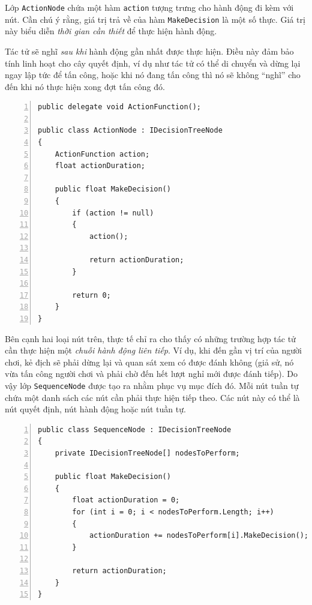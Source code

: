 \documentclass[12pt]{report}
\begin{document}
Lớp \texttt{ActionNode} chứa một hàm \texttt{action} tượng trưng cho hành động đi kèm với nút. Cần chú ý rằng, giá trị trả về của hàm \texttt{MakeDecision} là một số thực. Giá trị này biểu diễn \textit{thời gian cần thiết} để thực hiện hành động.

Tác tử sẽ nghĩ \textit{sau khi} hành động gần nhất được thực hiện. Điều này đảm bảo tính linh hoạt cho cây quyết định, ví dụ như tác tử có thể di chuyển và dừng lại ngay lập tức để tấn công, hoặc khi nó đang tấn công thì nó sẽ không ``nghĩ'' cho đến khi nó thực hiện xong đợt tấn công đó.

\begin{lstlisting}[frame=lines, basicstyle=\footnotesize\ttfamily, numbers=left, numberstyle=\tiny\color{black},caption= {Lớp \texttt{ActionNode}}, backgroundcolor=\color{background}]
public delegate void ActionFunction();

public class ActionNode : IDecisionTreeNode
{
	ActionFunction action;
	float actionDuration;

	public float MakeDecision()
	{
		if (action != null)
		{
			action();

			return actionDuration;
		}

		return 0;
	}
}
\end{lstlisting}

Bên cạnh hai loại nút trên, thực tế chỉ ra cho thấy có những trường hợp tác tử cần thực hiện một \textit{chuỗi hành động liên tiếp}. Ví dụ, khi đến gần vị trí của người chơi, kẻ địch sẽ phải dừng lại và quan sát xem có được đánh không (giả sử, nó vừa tấn công người chơi và phải chờ đến hết lượt nghỉ mới được đánh tiếp). Do vậy lớp \texttt{SequenceNode} được tạo ra nhằm phục vụ mục đích đó. Mỗi nút tuần tự chứa một danh sách các nút cần phải thực hiện tiếp theo. Các nút này có thể là nút quyết định, nút hành động hoặc nút tuần tự.

\begin{lstlisting}[frame=lines, basicstyle=\footnotesize\ttfamily, numbers=left, numberstyle=\tiny\color{black},caption= {Lớp \texttt{SequenceNode}}, backgroundcolor=\color{background}]
public class SequenceNode : IDecisionTreeNode
{
	private IDecisionTreeNode[] nodesToPerform;

	public float MakeDecision()
	{
		float actionDuration = 0;
		for (int i = 0; i < nodesToPerform.Length; i++)
		{
			actionDuration += nodesToPerform[i].MakeDecision();
		}

		return actionDuration;
	}
}
\end{lstlisting}
\end{document}
